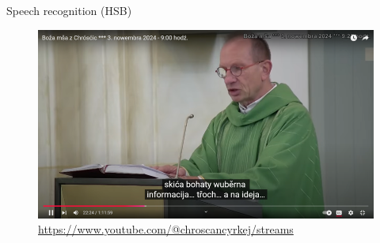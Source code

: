   \begin{block}{Speech recognition (HSB)}
    

    \begin{figure}
        \centering
        \includegraphics[width=0.7\colwidth]{01_z_01_citanje.png}
        \caption{\url{https://www.youtube.com/@chroscancyrkej/streams}}
        \label{fig:webcaptioner}
    \end{figure}

    
  \end{block}
